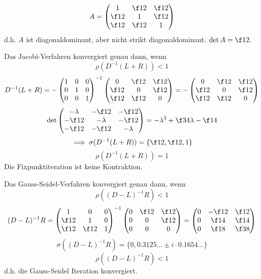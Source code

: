 \documentclass{mycourse}
\begin{document}
\begin{ex}
	\[
		A = \begin{pmatrix} 1 & \f12 & \f 12 \\ \f 12 & 1 & \f12\\ \f12 & \f12 & 1\end{pmatrix}
	\]
	d.h. $A$ ist diagonaldominant, aber nicht strikt diagonaldominant.
	$\det A = \f 12$.

	Das Jacobi-Verfahren konvergiert genau dann, wenn
	\[
		\rho(D^{-1}(L+R)) < 1
	\]
	\[
		D^{-1}(L+R) = -\begin{pmatrix}1&0&0\\0&1&0\\0&0&1\end{pmatrix}^{-1}\begin{pmatrix}0&\f12&\f12 \\ \f12 & 0 & \f12 \\ \f12 & \f12 & 0\end{pmatrix} = - \begin{pmatrix}0& \f12 & \f 12 \\ \f12 & 0 & \f 12 \\ \f 12  & \f12 & 0\end{pmatrix}
	\]
	\[
		\det\begin{pmatrix}-\lambda & -\f12 & -\f12 \\ -\f 12 & -\lambda & -\f 12 \\ -\f 12 & -\f12 & -\lambda\end{pmatrix} = -\lambda^3 + \f34 \lambda - \f 14
	\]
	\[
		\implies \sigma(D^{-1}(L+R)) = \{\f 12, \f 12, 1\}
	\]
	\[
		\rho (D^{-1}(L+R)) = 1
	\]
	Die Fixpunktiteration ist keine Kontraktion.

	Das Gauss-Seidel-Verfahren konvergiert genau dann, wenn
	\[
		\rho((D-L)^{-1}R) < 1
	\]
	\[
	(D-L)^{-1}R = \begin{pmatrix}1&0&0\\ \f12 & 1 & 0\\ \f12 & \f12 & 1\end{pmatrix}^{-1} \begin{pmatrix}0&\f12& \f12\\0&0&\f12\\0&0&0\end{pmatrix} = \begin{pmatrix}0& -\f12 & \f12\\0&\f14 & \f14\\0&\f18& \f38\end{pmatrix}
	\]
	\[
		\sigma((D-L)^{-1}R) = \{0,0.3125\dots \pm i\cdot 0.1654\dots\}
	\]
	\[
		\rho((D-L)^{-1}R) < 1
	\]
	d.h. die Gauss-Seidel Iteration konvergiert.

\end{ex}
\end{document}
